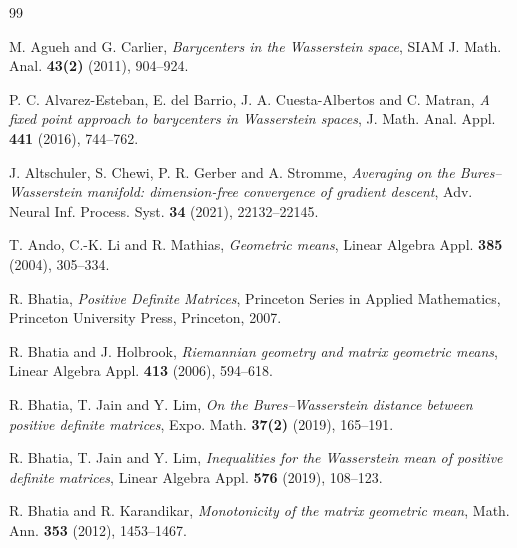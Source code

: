 \documentclass[12pt,reqno]{amsart}
\begin{document}
\begin{thebibliography}{99}


M. Agueh and G. Carlier, \emph{Barycenters in the Wasserstein space}, SIAM J. Math. Anal. \textbf{43(2)} (2011), 904--924.

P. C. Alvarez-Esteban, E. del Barrio, J. A. Cuesta-Albertos and C. Matran, \emph{A fixed point approach to barycenters in Wasserstein spaces}, J. Math. Anal. Appl. \textbf{441} (2016), 744--762.

J. Altschuler, S. Chewi, P. R. Gerber and A. Stromme, \emph{Averaging on the Bures--Wasserstein manifold: dimension-free convergence of gradient descent}, Adv. Neural Inf. Process. Syst. \textbf{34} (2021), 22132--22145.

T. Ando, C.-K. Li and R. Mathias, \emph{Geometric means}, Linear Algebra Appl. \textbf{385} (2004), 305--334.


R. Bhatia, \emph{Positive Definite Matrices}, Princeton Series in Applied Mathematics, Princeton University Press, Princeton, 2007.

R. Bhatia and J. Holbrook, \emph{Riemannian geometry and matrix geometric means}, Linear Algebra Appl. \textbf{413} (2006), 594--618.

R. Bhatia, T. Jain and Y. Lim, \emph{On the Bures--Wasserstein distance between positive definite matrices}, Expo. Math. \textbf{37(2)} (2019), 165--191.

R. Bhatia, T. Jain and Y. Lim, \emph{Inequalities for the Wasserstein mean of positive definite matrices}, Linear Algebra Appl. \textbf{576} (2019), 108--123.

R. Bhatia and R. Karandikar, \emph{Monotonicity of the matrix geometric mean}, Math. Ann. \textbf{353} (2012), 1453--1467.




\end{thebibliography}
\end{document}
